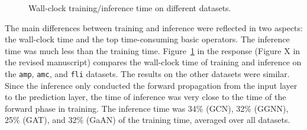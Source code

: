 \begin{figure}[H]
    \centering
    \caption{Wall-clock training/inference time on different datasets.}
    \label{fig:compare_wall_clock_time_of_training_and_inference}
\end{figure}

The main differences between training and inference were reflected in two aspects: the wall-clock time and the top time-consuming basic operators.
%
The inference time was much less than the training time.
%
Figure~\ref{fig:compare_wall_clock_time_of_training_and_inference} in the response (Figure X in the revised manuscript) compares the wall-clock time of training and inference on the \texttt{amp}, \texttt{amc}, and \texttt{fli} datasets.
%
The results on the other datasets were similar.
%
Since the inference only conducted the forward propagation from the input layer to the prediction layer, the time of inference was very close to the time of the forward phase in training.
%
The inference time was 34\% (GCN), 32\% (GGNN), 25\% (GAT), and 32\% (GaAN) of the training time, averaged over all datasets.

